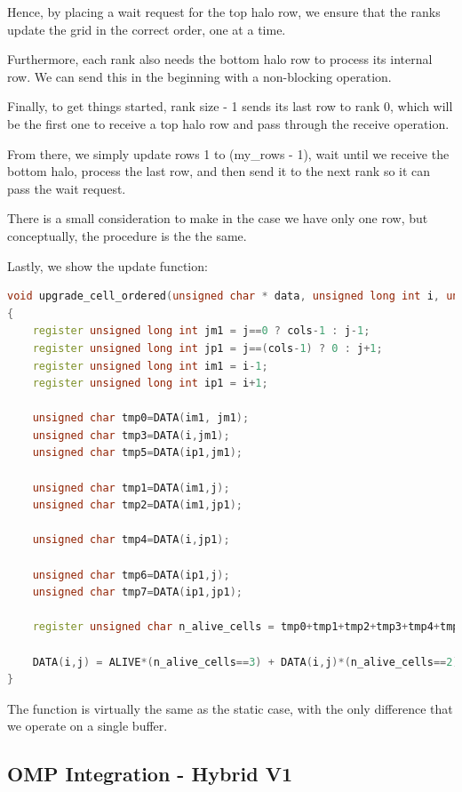 \documentclass{report}
\begin{document}
Hence, by placing a wait request for the top halo row, we ensure that the ranks 
update the grid in the correct order, one at a time.

Furthermore, each rank also needs the bottom halo row to process its internal
row. We can send this in the beginning with a non-blocking operation.

Finally, to get things started, rank size - 1 sends its last row to rank 0, which 
will be the first one to receive a top halo row and pass through the receive operation.

From there, we simply update rows 1 to (my\_rows - 1), wait until we receive 
the bottom halo, process the last row, and then send it to the next rank so it 
can pass the wait request.

There is a small consideration to make in the case we have only one row, but 
conceptually, the procedure is the the same.

Lastly, we show the update function:

\begin{lstlisting}[language=C++]
void upgrade_cell_ordered(unsigned char * data, unsigned long int i, unsigned long int j)
{
    register unsigned long int jm1 = j==0 ? cols-1 : j-1;
    register unsigned long int jp1 = j==(cols-1) ? 0 : j+1;
    register unsigned long int im1 = i-1;
    register unsigned long int ip1 = i+1;

    unsigned char tmp0=DATA(im1, jm1);
    unsigned char tmp3=DATA(i,jm1);
    unsigned char tmp5=DATA(ip1,jm1);

    unsigned char tmp1=DATA(im1,j);
    unsigned char tmp2=DATA(im1,jp1);

    unsigned char tmp4=DATA(i,jp1);

    unsigned char tmp6=DATA(ip1,j);
    unsigned char tmp7=DATA(ip1,jp1);

    register unsigned char n_alive_cells = tmp0+tmp1+tmp2+tmp3+tmp4+tmp5+tmp6+tmp7;

    DATA(i,j) = ALIVE*(n_alive_cells==3) + DATA(i,j)*(n_alive_cells==2);
}
\end{lstlisting}

The function is virtually the same as the static case, with the only difference 
that we operate on a single buffer.

\subsection{OMP Integration - Hybrid V1}
\end{document}
